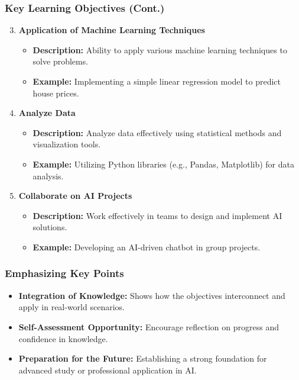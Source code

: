 \documentclass{beamer}
\begin{document}
\begin{frame}[fragile]
    \frametitle{Key Learning Objectives (Cont.)}
    \begin{enumerate}
        \setcounter{enumi}{2} %
        \item \textbf{Application of Machine Learning Techniques}
            \begin{itemize}
                \item \textbf{Description:} Ability to apply various machine learning techniques to solve problems.
                \item \textbf{Example:} Implementing a simple linear regression model to predict house prices.
            \end{itemize}
        \item \textbf{Analyze Data}
            \begin{itemize}
                \item \textbf{Description:} Analyze data effectively using statistical methods and visualization tools.
                \item \textbf{Example:} Utilizing Python libraries (e.g., Pandas, Matplotlib) for data analysis.
            \end{itemize}
        \item \textbf{Collaborate on AI Projects}
            \begin{itemize}
                \item \textbf{Description:} Work effectively in teams to design and implement AI solutions.
                \item \textbf{Example:} Developing an AI-driven chatbot in group projects.
            \end{itemize}
    \end{enumerate}
\end{frame}

\begin{frame}[fragile]
    \frametitle{Emphasizing Key Points}
    \begin{itemize}
        \item \textbf{Integration of Knowledge:} Shows how the objectives interconnect and apply in real-world scenarios.
        \item \textbf{Self-Assessment Opportunity:} Encourage reflection on progress and confidence in knowledge.
        \item \textbf{Preparation for the Future:} Establishing a strong foundation for advanced study or professional application in AI.
    \end{itemize}
\end{frame}
\end{document}
